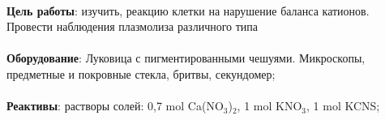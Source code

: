 




\begin{footnotesize}

\paragraph*{}\textbf{Цель работы}: изучить, реакцию клетки на нарушение баланса катионов. Провести наблюдения плазмолиза различного типа

\paragraph*{}\textbf{Оборудование}: Луковица с пигментированными чешуями. Микроскопы, предметные и покровные стекла, бритвы, секундомер;

\paragraph*{}\textbf{Реактивы}: растворы солей: 0,7 \gls{mol} Ca(NO${_3}$)$_2$, 1 \gls{mol} KNO$_3$, 1 \gls{mol} KCNS;

\end{footnotesize}


